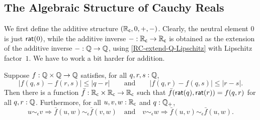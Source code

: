 \subsection{The Algebraic Structure of Cauchy Reals}
\label{sec:algebr-struct-cauchy}

We first define the additive structure $(\mathbb{R}_\mathsf{c}, 0, {+}, {-})$. Clearly, the neutral element
$0$ is just $\mathsf{rat}(0)$, while the additive inverse ${-} : \mathbb{R}_\mathsf{c} \to \mathbb{R}_\mathsf{c}$ is obtained as the
extension of the additive inverse ${-} : \mathbb{Q} \to \mathbb{Q}$, using \autoref{RC-extend-Q-Lipschitz}
with Lipschitz factor~$1$. We have to work a bit harder for addition.

\begin{lem} \label{RC-binary-nonexpanding-extension}
  Suppose $f : \mathbb{Q} \times \mathbb{Q} \to \mathbb{Q}$ satisfies, for all $q, r, s : \mathbb{Q}$,
  \begin{equation*}
    |f(q, s) - f(r, s)| \leq |q - r|
    \qquad\text{and}\qquad
    |f(q, r) - f(q, s)| \leq |r - s|.
  \end{equation*}
  Then there is a function $\bar{f} : \mathbb{R}_\mathsf{c} \times \mathbb{R}_\mathsf{c} \to \mathbb{R}_\mathsf{c}$ such that
  $\bar{f}(\mathsf{rat}(q), \mathsf{rat}(r)) = f(q,r)$ for all $q, r : \mathbb{Q}$. Furthermore,
  for all $u, v, w : \mathbb{R}_\mathsf{c}$ and $q : \mathbb{Q}_{+}$,
  \begin{equation*}
    u \sim_\epsilon v \Rightarrow \bar{f}(u,w) \sim_\epsilon \bar{f}(v,w)
    \quad\text{and}\quad
    v \sim_\epsilon w \Rightarrow \bar{f}(u,v) \sim_\epsilon \bar{f}(u,w).
  \end{equation*}
\end{lem}

